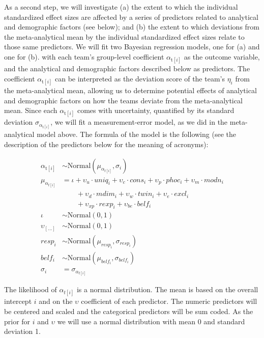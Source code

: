 \documentclass[
  english,
  man,floatsintext]{apa6}
\begin{document}
As a second step, we will investigate (a) the extent to which the individual standardized effect sizes are affected by a series of predictors related to analytical and demographic factors (see below); and (b) the extent to which deviations from the meta-analytical mean by the individual standardized effect sizes relate to those same predictors.
We will fit two Bayesian regression models, one for (a) and one for (b).
with each team's group-level coefficient \(\alpha_{\text{t}[i]}\) as the outcome variable, and the analytical and demographic factors described below as predictors.
The coefficient \(\alpha_{\text{t}[i]}\) can be interpreted as the deviation score of the team's \(\eta_i\) from the meta-analytical mean, allowing us to determine potential effects of analytical and demographic factors on how the teams deviate from the meta-analytical mean.
Since each \(\alpha_{\text{t}[i]}\) comes with uncertainty, quantified by its standard deviation \(\sigma_{\alpha_{\text{t}[i]}}\), we will fit a measurement-error model, as we did in the meta-analytical model above.
The formula of the model is the following (see the description of the predictors below for the meaning of acronyms):

\[
\begin{aligned}
\alpha_{\text{t}[i]}      & \sim \text{Normal}(\mu_{\alpha_{t[i]}}, \sigma_i) \\
\mu_{\alpha_{t[i]}}       & = \iota + \upsilon_u\cdot uniq_i + \upsilon_c\cdot cons_i + \upsilon_p\cdot phoc_i + \upsilon_m\cdot modn_i \\
 & \qquad + \upsilon_d\cdot mdim_i + \upsilon_w\cdot twin_i + \upsilon_e\cdot excl_i \\
 & \qquad + \upsilon_{xp}\cdot rexp_i + \upsilon_{be}\cdot belf_i  \\
\iota      & \sim \text{Normal}(0, 1) \\
\upsilon_{[\ldots]} & \sim \text{Normal}(0,1) \\
resp_i & \sim \text{Normal}(\mu_{resp_i}, \sigma_{resp_i}) \\
belf_i & \sim \text{Normal}(\mu_{belf_i}, \sigma_{belf_i}) \\
\sigma_i    & = \sigma_{\alpha_{t[i]}}
\end{aligned}
\]

The likelihood of \(\alpha_{t[i]}\) is a normal distribution.
The mean is based on the overall intercept \(i\) and on the \(\upsilon\) coefficient of each predictor.
The numeric predictors will be centered and scaled and the categorical predictors will be sum coded.
As the prior for \(i\) and \(\upsilon\) we will use a normal distribution with mean 0 and standard deviation 1.
\end{document}
